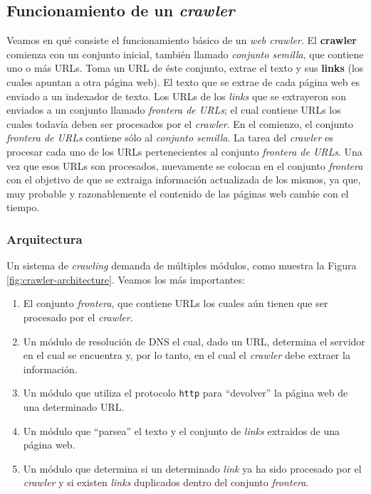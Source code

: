 	\subsection{Funcionamiento de un \textit{crawler}}
		Veamos en qué consiste el funcionamiento básico de un \textit{web crawler}. El \textbf{crawler} comienza con un conjunto inicial, también llamado \textit{conjunto semilla}, que contiene uno o más URLs. Toma un URL de éste conjunto, extrae el texto y sus \textbf{links} (los cuales apuntan a otra página web). El texto que se extrae de cada página web es enviado a un indexador de texto. Los URLs de los \textit{links} que se extrayeron son enviados a un conjunto llamado \textit{frontera de URLs}; el cual contiene URLs los cuales todavía deben ser procesados por el \textit{crawler}. En el comienzo, el conjunto \textit{frontera de URLs} contiene sólo al \textit{conjunto semilla}. La tarea del \textit{crawler} es procesar cada uno de los URLs pertenecientes al conjunto \textit{frontera de URLs}. Una vez que esos URLs son procesados, nuevamente se colocan en el conjunto \textit{frontera} con el objetivo de que se extraiga información actualizada de los mismos, ya que, muy probable y razonablemente el contenido de las páginas web cambie con el tiempo.
		\subsubsection{Arquitectura}
			Un sistema de \textit{crawling} demanda de múltiples módulos, como muestra la Figura \ref{fig:crawler-architecture}. Veamos los más importantes:
			\begin{enumerate}
				\item El conjunto \textit{frontera}, que contiene URLs los cuales aún tienen que ser procesado por el \textit{crawler}.
				\item Un módulo de resolución de DNS el cual, dado un URL, determina el servidor en el cual se encuentra y, por lo tanto, en el cual el \textit{crawler} debe extraer la información.
				\item Un módulo que utiliza el protocolo \texttt{http} para \enquote{devolver} la página web de una determinado URL.
				\item Un módulo que \enquote{parsea} el texto y el conjunto de \textit{links} extraidos de una página web.
				\item Un módulo que determina si un determinado \textit{link} ya ha sido procesado por el \textit{crawler} y si existen \textit{links} duplicados dentro del conjunto \textit{frontera}.
			\end{enumerate}
			
